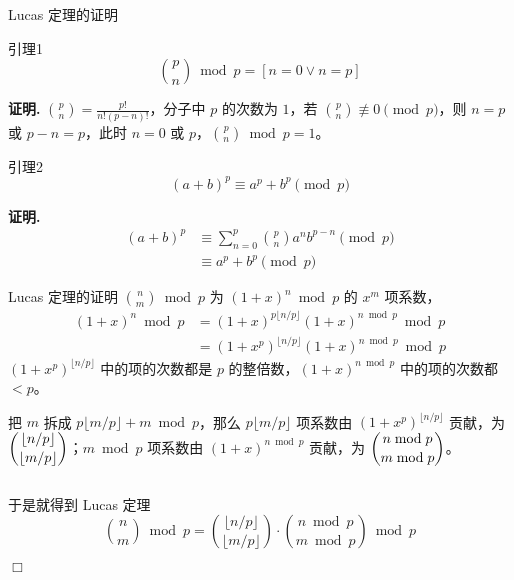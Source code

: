 \documentclass[UTF8]{beamer}
\begin{document}
    \begin{frame}{Lucas 定理的证明}
        \begin{block}{引理1}\vspace{-1em}
            $$
            \binom{p}{n}\bmod p = [n=0\lor  n=p]
            $$\vspace{-1em}
        \end{block}
        \textbf{证明.} $\binom{p}{n}=\frac{p!}{n!(p-n)!}$，分子中 $p$ 的次数为 $1$，若 $\binom{p}{n}\not\equiv 0 \pmod p$，则 $n=p$ 或 $p-n=p$，此时 $n=0$ 或 $p$，$\binom{p}{n}\bmod p = 1$。

        \pause

        \begin{block}{引理2}
            \vspace{-1em}
            $$
            (a+b)^p\equiv a^p+b^p \pmod p
            $$
            \vspace{-1em}
        \end{block}
        \textbf{证明.}
        \vspace{-1em}
        $$
        \begin{aligned}
        (a+b)^p&\equiv \sum_{n=0}^p\binom{p}{n}a^nb^{p-n} \pmod p\\
        &\equiv a^p+b^p \pmod p
        \end{aligned}
        $$
    \end{frame}

    \begin{frame}{Lucas 定理的证明}
        $\binom{n}{m}\bmod p$ 为 $(1+x)^n\bmod p $ 的 $x^m$ 项系数，
        $$
        \begin{aligned}
        (1+x)^n\bmod p &= (1+x)^{p\lfloor n/p\rfloor }(1+x)^{n\bmod p}\bmod p\\
        &= (1+x^p)^{\lfloor n/p\rfloor }(1+x)^{n\bmod p}\bmod p
        \end{aligned}
        $$
        $(1+x^p)^{\lfloor n/p\rfloor }$ 中的项的次数都是 $p$ 的整倍数，$(1+x)^{n\bmod p}$ 中的项的次数都 $<p$。
        
        把 $m$ 拆成 $p\lfloor m/p\rfloor + m\bmod p$，那么 $p\lfloor m/p\rfloor$ 项系数由 $(1+x^p)^{\lfloor n/p\rfloor }$ 贡献，为 $\dbinom{\lfloor n/p\rfloor}{\lfloor m/p\rfloor}$；$m\bmod p$ 项系数由 $(1+x)^{n\bmod p}$ 贡献，为 $\dbinom{n\bmod p}{m\bmod p}$。

        $\ $

        于是就得到 Lucas 定理
        $$
        \binom{n}{m}\bmod p = \binom{\lfloor n/p\rfloor}{\lfloor m/p\rfloor}\cdot\binom{n\bmod p}{m\bmod p}\bmod p
        $$
        
        \vspace{-2em}
        \hfill $\Box$

    \end{frame}
\end{document}
